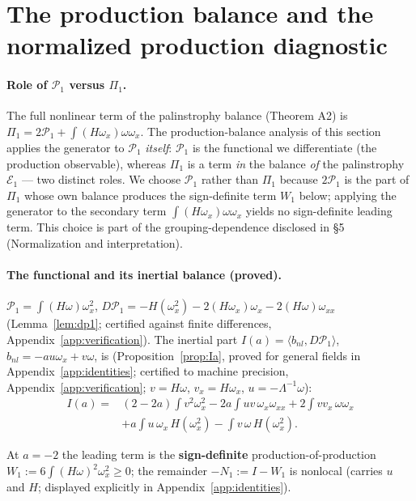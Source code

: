\documentclass[11pt]{article}
\theoremstyle{remark}
\theoremstyle{plain}
\newcommand{\eqdef}{:=}
\begin{document}
\section{The production balance and the normalized production diagnostic}

\paragraph{Role of $\mathcal{P}_1$ versus $\Pi_1$.} The full nonlinear term of the
palinstrophy balance (Theorem A2) is $\Pi_1 = 2\mathcal{P}_1 + \int(H\omega_x)\omega\omega_x$. The
production-balance analysis of this section applies the generator to $\mathcal{P}_1$
\emph{itself}: $\mathcal{P}_1$ is the functional we differentiate (the production
observable), whereas $\Pi_1$ is a term \emph{in} the balance \emph{of} the palinstrophy
$\mathcal{E}_1$ --- two distinct roles. We choose $\mathcal{P}_1$ rather than $\Pi_1$
because $2\mathcal{P}_1$ is the part of $\Pi_1$ whose own balance produces the
sign-definite term $W_1$ below; applying the generator to the secondary term
$\int(H\omega_x)\omega\omega_x$ yields no sign-definite leading term. This choice is part of the
grouping-dependence disclosed in \S5 (Normalization and interpretation).

\paragraph{The functional and its inertial balance (proved).} $\mathcal{P}_1 = \int(H\omega)\omega_x^2$,
$D\mathcal{P}_1 = -H(\omega_x^2) - 2(H\omega_x)\omega_x - 2(H\omega)\omega_{xx}$
(Lemma~\ref{lem:dp1}; certified against finite differences, Appendix~\ref{app:verification}). The inertial part
$I(a) = \langle b_{nl}, D\mathcal{P}_1\rangle$,
$b_{nl} = -au\omega_x + v\omega$, is (Proposition~\ref{prop:Ia}, proved for general fields in
Appendix~\ref{app:identities}; certified to machine precision, Appendix~\ref{app:verification}; $v=H\omega$,
$v_x=H\omega_x$, $u=-\Lambda^{-1}\omega$):
\begin{equation}
\begin{aligned}
   I(a) = {}& (2-2a)\int v^2\omega_x^2 - 2a\int uv\,\omega_x\omega_{xx} + 2\int v v_x\,\omega\omega_x \\
   & + a\int u\,\omega_x\, H(\omega_x^2) - \int v\,\omega\, H(\omega_x^2).
\end{aligned}
\end{equation}

At $a=-2$ the leading term is the \textbf{sign-definite} production-of-production
$W_1 \eqdef 6\int(H\omega)^2\omega_x^2 \ge 0$; the remainder $-N_1 \eqdef I - W_1$ is nonlocal (carries $u$ and
$H$; displayed explicitly in Appendix~\ref{app:identities}).
\end{document}
